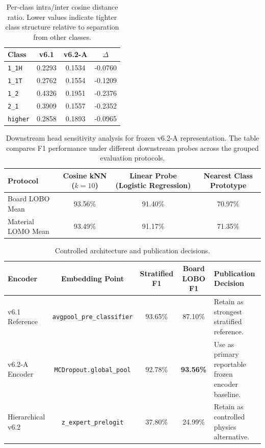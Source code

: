 \documentclass[review,3p,times]{elsarticle}
\begin{document}
\begin{table}[htbp]
\centering
\caption{Per-class intra/inter cosine distance ratio. Lower values indicate tighter class structure relative to separation from other classes.}
\label{tab:per_class_geometry}
\begin{tabular}{lccc}
\toprule
\textbf{Class} & \textbf{v6.1} & \textbf{v6.2-A} & \textbf{$\Delta$} \\
\midrule
\texttt{1\_1H} & 0.2293 & 0.1534 & -0.0760 \\
\texttt{1\_1T} & 0.2762 & 0.1554 & -0.1209 \\
\texttt{1\_2} & 0.4326 & 0.1951 & -0.2376 \\
\texttt{2\_1} & 0.3909 & 0.1557 & -0.2352 \\
\texttt{higher} & 0.2858 & 0.1893 & -0.0965 \\
\bottomrule
\end{tabular}
\end{table}

\begin{table}[htbp]
\centering
\caption{Downstream head sensitivity analysis for frozen v6.2-A representation. The table compares F1 performance under different downstream probes across the grouped evaluation protocols.}
\label{tab:downstream_heads}
\begin{tabular}{lccc}
\toprule
\textbf{Protocol} & \textbf{Cosine kNN ($k=10$)} & \textbf{Linear Probe (Logistic Regression)} & \textbf{Nearest Class Prototype} \\
\midrule
Board LOBO Mean & 93.56\% & 91.40\% & 70.97\% \\
Material LOMO Mean & 93.49\% & 91.17\% & 71.35\% \\
\bottomrule
\end{tabular}
\end{table}

\begin{table}[htbp]
\centering
\caption{Controlled architecture and publication decisions.}
\label{tab:table3}
\begin{tabular}{lcccl}
\toprule
\textbf{Encoder} & \textbf{Embedding Point} & \textbf{Stratified F1} & \textbf{Board LOBO F1} & \textbf{Publication Decision} \\
\midrule
v6.1 Reference & \texttt{avgpool\_pre\_classifier} & 93.65\% & 87.10\% & Retain as strongest stratified reference. \\
v6.2-A Encoder & \texttt{MCDropout.global\_pool} & 92.78\% & \textbf{93.56\%} & Use as primary reportable frozen encoder baseline. \\
Hierarchical v6.2 & \texttt{z\_expert\_prelogit} & 37.80\% & 24.99\% & Retain as controlled physics alternative. \\
\bottomrule
\end{tabular}
\end{table}
\end{document}
